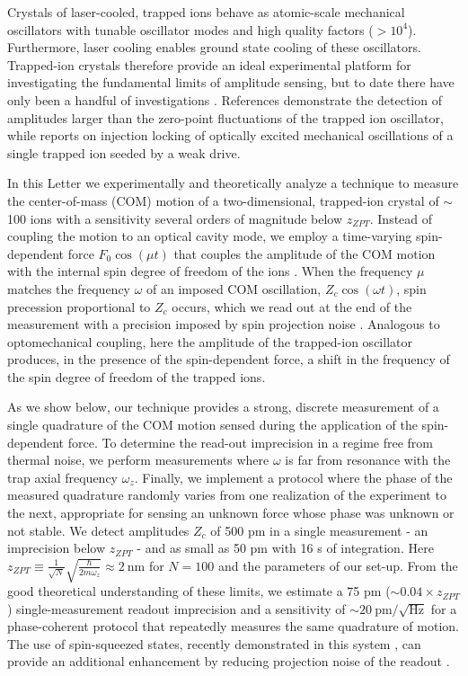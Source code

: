 \documentclass[aps,prl,twocolumn,superscriptaddress,floatfix]{revtex4-1}
\begin{document}
Crystals of laser-cooled, trapped ions behave as atomic-scale mechanical oscillators \citep{Jost2009,Biercuk2010,Sawyer2012} with tunable oscillator modes and high quality factors ($ > 10^4$). Furthermore, laser cooling enables ground state cooling of these oscillators. Trapped-ion crystals therefore provide an ideal experimental platform for investigating the fundamental limits of amplitude sensing, but to date there have only been a handful of investigations \citep{Biercuk2010,Sawyer2012,Shaniv2016,Knunz2010}. References \citep{Biercuk2010,Sawyer2012,Shaniv2016} demonstrate the detection of amplitudes larger than the zero-point fluctuations of the trapped ion oscillator, while \citep{Knunz2010} reports on injection locking of optically excited mechanical oscillations of a single trapped ion seeded by a weak drive.

In this Letter we experimentally and theoretically analyze a technique to measure the center-of-mass (COM) motion of a two-dimensional, trapped-ion crystal of $\sim$100 ions with a sensitivity several orders of magnitude below $z_{ZPT}$. Instead of coupling the motion to an optical cavity mode, we employ a time-varying spin-dependent force $F_0\cos\left(\mu t\right)$ that couples the amplitude of the COM motion with the internal spin degree of freedom of the ions \citep{Sawyer2014,Ivanov2016}. When the frequency $\mu$ matches the frequency $\omega$ of an imposed COM oscillation, $Z_{c}\cos\left(\omega t\right)$, spin precession proportional to $Z_{c}$ occurs, which we read out at the end of the measurement with a precision imposed by spin projection noise \citep{Itano1993}. Analogous to optomechanical coupling, here the amplitude of the trapped-ion oscillator produces, in the presence of the spin-dependent force, a shift in the frequency of the spin degree of freedom of the trapped ions. 

As we show below, our technique provides a strong, discrete measurement of a single quadrature of the COM motion sensed during the application of the spin-dependent force. To determine the read-out imprecision in a regime free from thermal noise, we perform measurements where $\omega$ is far from resonance with the trap axial frequency $\omega_z$. Finally, we implement a protocol where the phase of the measured quadrature randomly varies from one realization of the experiment to the next, appropriate for sensing an unknown force whose phase was unknown or not stable. We detect amplitudes $Z_c$ of 500 pm in a single measurement - an imprecision below $z_{ZPT}$ - and as small as 50 pm with 16 s of integration. Here $z_{ZPT} \equiv \frac{1}{\sqrt{N}}\sqrt{\frac{\hbar}{2m\omega_z}} \approx 2\:\mathrm{nm}$ for $N = 100$ and the parameters of our set-up. From the good theoretical understanding of these limits, we estimate a 75 pm ($\sim 0.04 \times z_{ZPT}$) single-measurement readout imprecision and a sensitivity of $\sim 20\: \mathrm{pm}/\sqrt{\mathrm{Hz}}$ for a phase-coherent protocol that repeatedly measures the same quadrature of motion. The use of spin-squeezed states, recently demonstrated in this system \citep{Bohnet2015}, can provide an additional enhancement by reducing projection noise of the readout .
\end{document}
